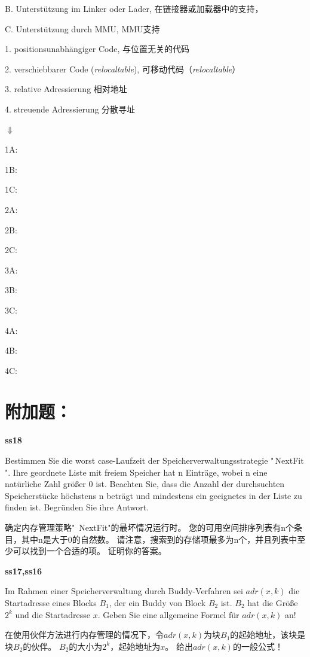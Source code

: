 \documentclass[fleqn]{article}
\begin{document}
B. Unterstützung im Linker oder Lader, 在链接器或加载器中的支持，

C. Unterstützung durch MMU, MMU支持

1. positionsunabhängiger Code, 与位置无关的代码

2. verschiebbarer Code (\textit{relocaltable}), 可移动代码（\textit {relocaltable}）

3. relative Adressierung 相对地址

4. streuende Adressierung 分散寻址

$\Downarrow$

1A:

1B:

1C:

2A:

2B:

2C:

3A:

3B:

3C:

4A:

4B:

4C:



\section{附加题：}

\noindent\textbf{ss18}

Bestimmen Sie die worst case-Laufzeit der Speicherverwaltungsstrategie "\,NextFit ".
Ihre geordnete Liste mit freiem Speicher hat n Einträge, wobei n eine natürliche Zahl 
größer 0 ist. Beachten Sie, dass die Anzahl der durchsuchten Speicherstücke höchstens n 
beträgt und mindestens ein geeignetes in der Liste zu finden ist. 
Begründen Sie ihre Antwort.

确定内存管理策略" \,NextFit"的最坏情况运行时。 
您的可用空间排序列表有n个条目，其中n是大于0的自然数。 请注意，搜索到的存储项最多为n个，并且列表中至少可以找到一个合适的项。 证明你的答案。

\noindent\textbf{ss17,ss16}

Im Rahmen einer Speicherverwaltung durch Buddy-Verfahren sei 
$adr(x, k)$ die Startadresse eines Blocks $B_1$, der ein Buddy von Block $B_2$ ist. 
$B_2$ hat die Größe $2^k$ und die Startadresse $x$. 
Geben Sie eine allgemeine Formel für $adr(x, k)$ an!

在使用伙伴方法进行内存管理的情况下，令$ adr(x,k)$为块$ B_1 $的起始地址，该块是块$ B_2 $的伙伴。
$ B_2 $的大小为$ 2^k $，起始地址为$ x $。 给出$ adr(x,k)$的一般公式！
\end{document}
